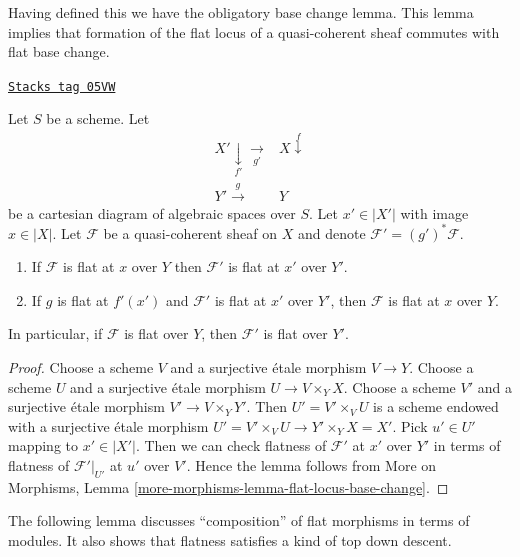 Having defined this we have the obligatory base change lemma.
This lemma implies that formation of the flat locus of a quasi-coherent
sheaf commutes with flat base change.

\begin{lemma}
\label{spaces-morphisms-lemma-base-change-module-flat}
\href{https://stacks.math.columbia.edu/tag/05VW}{\texttt{Stacks tag 05VW}}

Let $S$ be a scheme. Let
$$
\begin{array}{cc}X' \underset{f'}{\downarrow}\underset{g'}{\longrightarrow} & X \overset{f}{\downarrow} \\ Y' \overset{g}{\longrightarrow} & Y\end{array}
$$
be a cartesian diagram of algebraic spaces over $S$. Let $x' \in |X'|$
with image $x \in |X|$. Let $\mathcal{F}$ be a quasi-coherent
sheaf on $X$ and denote $\mathcal{F}' = (g')^*\mathcal{F}$.
\begin{enumerate}
\item If $\mathcal{F}$ is flat at $x$ over $Y$
then $\mathcal{F}'$ is flat at $x'$ over $Y'$.
\item If $g$ is flat at $f'(x')$ and
$\mathcal{F}'$ is flat at $x'$ over $Y'$, then
$\mathcal{F}$ is flat at $x$ over $Y$.
\end{enumerate}
In particular, if $\mathcal{F}$ is flat over $Y$, then
$\mathcal{F}'$ is flat over $Y'$.
\end{lemma}

\begin{proof}
Choose a scheme $V$ and a surjective \'etale morphism $V \to Y$.
Choose a scheme $U$ and a surjective \'etale morphism $U \to V \times_Y X$.
Choose a scheme $V'$ and a surjective \'etale morphism $V' \to V \times_Y Y'$.
Then $U' = V' \times_V U$ is a scheme endowed with a surjective \'etale
morphism $U' = V' \times_V U \to Y' \times_Y X = X'$. Pick $u' \in U'$
mapping to $x' \in |X'|$. Then we can check flatness of
$\mathcal{F}'$ at $x'$ over $Y'$ in terms of flatness of
$\mathcal{F}'|_{U'}$ at $u'$ over $V'$. Hence the lemma follows from
More on Morphisms, Lemma \ref{more-morphisms-lemma-flat-locus-base-change}.
\end{proof}

The following lemma discusses ``composition'' of flat morphisms in
terms of modules. It also shows that flatness satisfies a kind of
top down descent.

